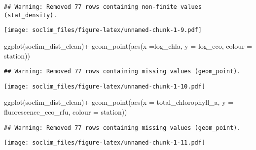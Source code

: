 \documentclass[
]{article}
\newenvironment{Shaded}{\begin{snugshade}}{\end{snugshade}}
\newcommand{\AttributeTok}[1]{\textcolor[rgb]{0.77,0.63,0.00}{#1}}
\newcommand{\FunctionTok}[1]{\textcolor[rgb]{0.00,0.00,0.00}{#1}}
\newcommand{\NormalTok}[1]{#1}
\newcommand{\SpecialCharTok}[1]{\textcolor[rgb]{0.00,0.00,0.00}{#1}}
\begin{document}
\begin{verbatim}
## Warning: Removed 77 rows containing non-finite values (stat_density).
\end{verbatim}

\texttt{[image: soclim\_files/figure-latex/unnamed-chunk-1-9.pdf]}

\begin{Shaded}
\begin{Highlighting}[]
\FunctionTok{ggplot}\NormalTok{(soclim\_dist\_clean)}\SpecialCharTok{+}
  \FunctionTok{geom\_point}\NormalTok{(}\FunctionTok{aes}\NormalTok{(}\AttributeTok{x =}\NormalTok{log\_chla, }\AttributeTok{y =}\NormalTok{ log\_eco, }\AttributeTok{colour =}\NormalTok{ station))}
\end{Highlighting}
\end{Shaded}

\begin{verbatim}
## Warning: Removed 77 rows containing missing values (geom_point).
\end{verbatim}

\texttt{[image: soclim\_files/figure-latex/unnamed-chunk-1-10.pdf]}

\begin{Shaded}
\begin{Highlighting}[]
\FunctionTok{ggplot}\NormalTok{(soclim\_dist\_clean)}\SpecialCharTok{+}
  \FunctionTok{geom\_point}\NormalTok{(}\FunctionTok{aes}\NormalTok{(}\AttributeTok{x =}\NormalTok{ total\_chlorophyll\_a, }\AttributeTok{y =}\NormalTok{ fluorescence\_eco\_rfu, }\AttributeTok{colour =}\NormalTok{ station))}
\end{Highlighting}
\end{Shaded}

\begin{verbatim}
## Warning: Removed 77 rows containing missing values (geom_point).
\end{verbatim}

\texttt{[image: soclim\_files/figure-latex/unnamed-chunk-1-11.pdf]}
\end{document}
